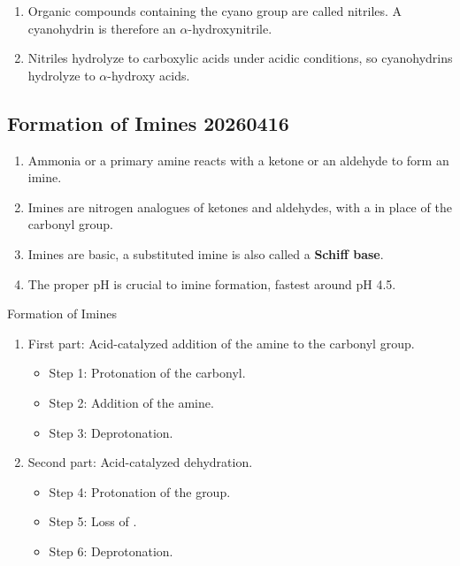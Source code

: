 \begin{enumerate}[resume]
    \item Organic compounds containing the cyano group are called nitriles. A cyanohydrin is therefore an $\alpha$-hydroxynitrile.
    \item Nitriles hydrolyze to carboxylic acids under acidic conditions, so cyanohydrins hydrolyze to $\alpha$-hydroxy acids.
\end{enumerate}

\subsection{Formation of Imines 20260416}

\begin{enumerate}
    \item Ammonia or a primary amine reacts with a ketone or an aldehyde to form an imine.
    \item Imines are nitrogen analogues of ketones and aldehydes, with a  in place of the carbonyl group.
    \item Imines are basic, a substituted imine is also called a \textbf{Schiff base}. %
    \item The proper pH is crucial to imine formation, fastest around pH 4.5.
\end{enumerate}

\begin{mechanism}
    Formation of Imines
    \begin{enumerate}
        \item First part: Acid-catalyzed addition of the amine to the carbonyl group.
        \begin{itemize}
            \item Step 1: Protonation of the carbonyl.
            \item Step 2: Addition of the amine.
            \item Step 3: Deprotonation.
        \end{itemize}
        \item Second part: Acid-catalyzed dehydration.
        \begin{itemize}
            \item Step 4: Protonation of the  group.
            \item Step 5: Loss of .
            \item Step 6: Deprotonation.
        \end{itemize}
    \end{enumerate}
\end{mechanism}

